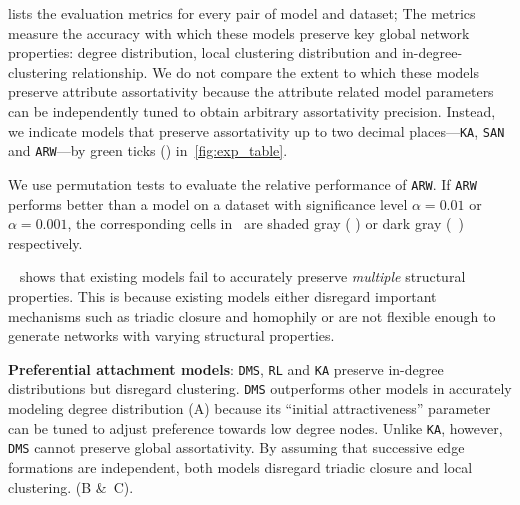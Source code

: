  lists the evaluation metrics for every pair of model
and dataset; The metrics measure the accuracy with which these models
preserve key global network properties: degree distribution, local clustering distribution
and in-degree-clustering relationship. We do not compare the extent to which these models preserve attribute assortativity because the attribute related model parameters can be independently tuned to obtain arbitrary assortativity precision. Instead, we indicate models that preserve assortativity up to two decimal
places---\texttt{KA}, \texttt{SAN} and \texttt{ARW}---by green ticks (\checkmark) in~\cref{fig:exp_table}.

We use permutation tests \cite{good2013permutation} to evaluate the relative
performance of \texttt{ARW}. If
\texttt{ARW} performs better than a model on a dataset with significance level
$\alpha=0.01$ or $\alpha=0.001$, the corresponding cells in~
are shaded gray ( \lightgraybg{ }) or dark gray (~\darkgraybg{ }) respectively.


~ shows that existing models fail to accurately preserve
\textit{multiple} structural properties. This is because existing models either
disregard important mechanisms such as triadic closure and homophily or are not
flexible enough to generate networks with varying structural properties.


\textbf{Preferential attachment models}: \texttt{DMS}, \texttt{RL}
and \texttt{KA} preserve in-degree distributions but disregard
clustering. \texttt{DMS} outperforms other models in accurately modeling
degree distribution (A) because its ``initial attractiveness''
parameter can be tuned to adjust preference towards low degree nodes. Unlike \texttt{KA}, however,
\texttt{DMS} cannot preserve global assortativity.
By assuming that successive edge formations are independent, both models disregard
triadic closure and local clustering. (B \&~C).

